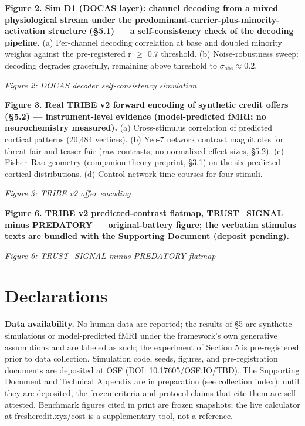 \documentclass[11pt,twocolumn]{article}
\theoremstyle{plain}
\begin{document}
\textbf{Figure 2. Sim D1 (DOCAS layer): channel decoding from a mixed physiological stream under the predominant-carrier-plus-minority-activation structure (\S{}5.1) — a self-consistency check of the decoding pipeline.} (a) Per-channel decoding correlation at base and doubled minority weights against the pre-registered r $\geq$ 0.7 threshold. (b) Noise-robustness sweep: decoding degrades gracefully, remaining above threshold to $\sigma_{\mathrm{obs}} \approx 0.2$.

\textit{Figure 2: DOCAS decoder self-consistency simulation}

\textbf{Figure 3. Real TRIBE v2 forward encoding of synthetic credit offers (\S{}5.2) — instrument-level evidence (model-predicted fMRI; no neurochemistry measured).} (a) Cross-stimulus correlation of predicted cortical patterns (20,484 vertices). (b) Yeo-7 network contrast magnitudes for threat-fair and teaser-fair (raw contrasts; no normalized effect sizes, \S{}5.2). (c) Fisher–Rao geometry (companion theory preprint, \S{}3.1) on the six predicted cortical distributions. (d) Control-network time courses for four stimuli.

\textit{Figure 3: TRIBE v2 offer encoding}

\textbf{Figure 6. TRIBE v2 predicted-contrast flatmap, TRUST\_SIGNAL minus PREDATORY — original-battery figure; the verbatim stimulus texts are bundled with the Supporting Document (deposit pending).}

\textit{Figure 6: TRUST\_SIGNAL minus PREDATORY flatmap}




\FloatBarrier
\section*{Declarations}

\textbf{Data availability.} No human data are reported; the results of \S{}5 are synthetic simulations or model-predicted fMRI under the framework's own generative assumptions and are labeled as such; the experiment of Section 5 is pre-registered prior to data collection. Simulation code, seeds, figures, and pre-registration documents are deposited at OSF (DOI: 10.17605/OSF.IO/TBD). The Supporting Document and Technical Appendix are in preparation (see collection index); until they are deposited, the frozen-criteria and protocol claims that cite them are self-attested. Benchmark figures cited in print are frozen snapshots; the live calculator at freshcredit.xyz/cost is a supplementary tool, not a reference.
\end{document}
